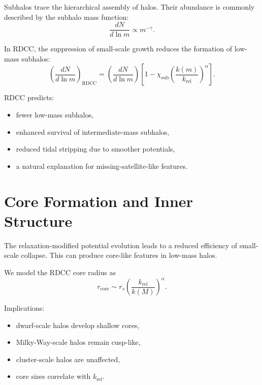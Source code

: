 \documentclass[11pt,a4paper]{article}
\begin{document}
Subhalos trace the hierarchical assembly of halos. Their abundance is commonly 
described by the subhalo mass function:
\begin{equation}
    \frac{dN}{d\ln m}
    \propto m^{-\gamma}.
\end{equation}

In RDCC, the suppression of small-scale growth reduces the formation of low-mass 
subhalos:
\begin{equation}
    \left(\frac{dN}{d\ln m}\right)_{\mathrm{RDCC}}
    = \left(\frac{dN}{d\ln m}\right)
      \left[1 - \chi_{\mathrm{sub}}
      \left(\frac{k(m)}{k_{\mathrm{rel}}}\right)^{\alpha}\right].
\end{equation}

RDCC predicts:
\begin{itemize}[leftmargin=1.2cm]
    \item fewer low-mass subhalos,
    \item enhanced survival of intermediate-mass subhalos,
    \item reduced tidal stripping due to smoother potentials,
    \item a natural explanation for missing-satellite-like features.
\end{itemize}
\section{Core Formation and Inner Structure}

The relaxation-modified potential evolution leads to a reduced efficiency of 
small-scale collapse. This can produce core-like features in low-mass halos.

We model the RDCC core radius as
\begin{equation}
    r_{\mathrm{core}}
    \sim r_{s}
    \left(\frac{k_{\mathrm{rel}}}{k(M)}\right)^{\alpha}.
\end{equation}

Implications:
\begin{itemize}[leftmargin=1.2cm]
    \item dwarf-scale halos develop shallow cores,
    \item Milky-Way-scale halos remain cusp-like,
    \item cluster-scale halos are unaffected,
    \item core sizes correlate with $k_{\mathrm{rel}}$.
\end{itemize}
\end{document}
